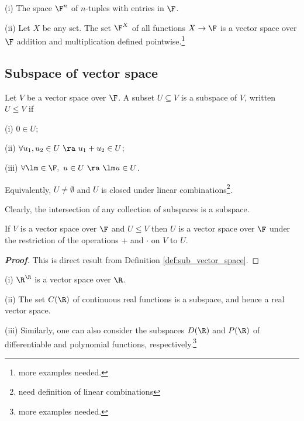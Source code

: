 \begin{example}
\ben
\item [(i)] The space $\F^n$ of $n$-tuples with entries in $\F$.
\item [(ii)] Let $X$ be any set. The set $\F^X$ of all functions $X \to \F$ is a vector space over $\F$ addition and multiplication defined pointwise.\footnote{more examples needed.}
\een
\end{example}

\subsection{Subspace of vector space}

\begin{definition}\label{def:sub_vector_space}
Let $V$ be a vector space over $\F$. A subset $U \subseteq V$ is a subspace of $V$, written $U \leq V$ if
\ben
\item [(i)] $0 \in U$;
\item [(ii)] $\forall u_1, u_2 \in U \ \ra\ u_1 + u_2 \in U$;
\item [(iii)] $\forall \lm \in \F,\ u \in U \ \ra\ \lm u \in U$.
\een

Equivalently, $U \neq \emptyset$ and $U$ is closed under linear combinations\footnote{need definition of linear combinations}.
\end{definition}

\begin{remark}
Clearly, the intersection of any collection of subspaces is a subspace.
\end{remark}

\begin{lemma}
If $V$ is a vector space over $\F$ and $U \leq V$ then $U$ is a vector space over $\F$ under the restriction of the operations $+$ and $\cdot$ on $V$ to $U$.
\end{lemma}

\begin{proof}[\bf Proof]
This is direct result from Definition \ref{def:sub_vector_space}.
\end{proof}

\begin{example}\label{exa:vector_space}
\ben
\item [(i)] $\R^\R$ is a vector space over $\R$.
\item [(ii)] The set $C(\R)$ of continuous real functions is a subspace, and hence a real vector space.
\item [(iii)] Similarly, one can also consider the subspaces $D(\R)$ and $P(\R)$ of differentiable and polynomial functions, respectively.\footnote{more examples needed.}
\een
\end{example}



